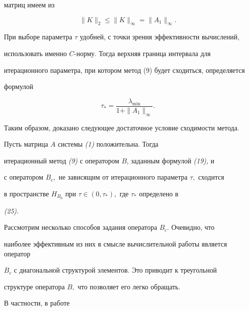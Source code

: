 матриц имеем из \cite{Gul} 


$$ 


\|K\|_2 \le \|K\|_\infty =\|A_1\|_\infty. 


$$ 


 


При выборе параметра $\tau$ удобней, с точки зрения эффективности вычислений, 


использовать именно $C$-норму. Тогда верхняя граница интервала для 


итерационного параметра, при котором метод (9) будет сходиться, определяется 


формулой 


\begin{equation} 


\tau _*=\frac{\lambda_{\text{min}}} 


{1+\|A_1\|_\infty}. 


\end{equation} 


 


Таким образом, доказано следующее достаточное условие сходимости метода. 


 


\begin{thm} Пусть матрица $A$ системы {\em (1)} положительна. Тогда 


итерационный метод {\em (9)} с оператором $B$, заданным формулой {\em (19),} и 


с оператором $B_c,$ не зависящим от итерационного параметра $\tau ,$ сходится 


в пространстве $H_{B_0}$ при $\tau\in(0,\tau_*),$ где $\tau_*$ определено в 


{\em (25).} 


\end{thm} 


Рассмотрим несколько способов задания оператора $B_c$. Очевидно, что 


наиболее эффективным из них в смысле вычислительной работы является оператор 


$B_c$ с диагональной структурой элементов. Это приводит к треугольной 


структуре оператора $B,$ что позволяет его легко обращать. 


 


В частности, в работе \cite{Kru3} 


